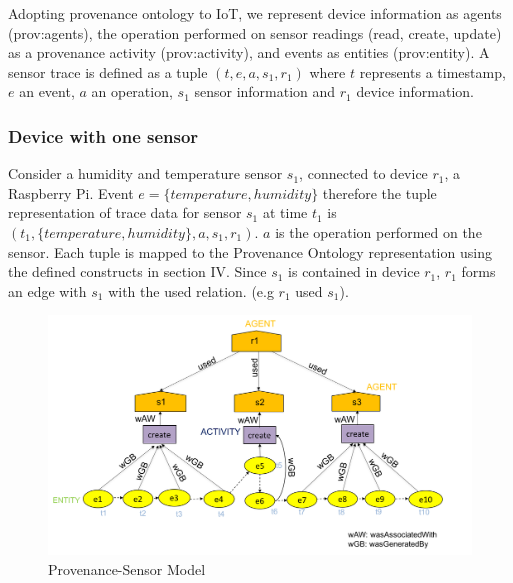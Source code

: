 \par Adopting provenance ontology to IoT, we represent device information as agents (prov:agents), the operation performed on sensor readings (read, create, update) as a provenance activity (prov:activity), and events as entities (prov:entity). A sensor trace is defined as a tuple  $ (t, e, a, s_1, r_1)$ where $t$ represents a timestamp, $e$ an event, $a$ an operation, $s_1$ sensor information and $r_1$ device information.  







\subsubsection{Device with one sensor} 

Consider a humidity and temperature sensor $s_1$, connected to device $r_1$, a Raspberry Pi. Event $e= \{temperature, humidity\}$ therefore the tuple representation of trace data for sensor $s_1$ at time $t_1$ is $(t_1, \{temperature, humidity\}, a,  s_1, r_1)$. $a$ is the operation performed on the sensor. Each tuple is mapped to the Provenance Ontology representation using the defined constructs in section IV. Since $s_1$ is contained in device $r_1$, $r_1$ forms an edge with $s_1$ with the used relation. (e.g $r_1$ used $s_1$). 

\begin{figure}[h!]
\begin{center}

\includegraphics[width=\columnwidth]{prov_sensor_10.PNG}
\end{center}
\caption{Provenance-Sensor Model }
\label{prov_sensor}
\end{figure}

